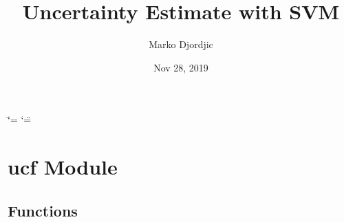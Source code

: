 \documentclass[letterpaper,10pt,english]{sphinxmanual}
\title{Uncertainty Estimate with SVM}
\date{Nov 28, 2019}
\author{Marko Djordjic}
\begin{document}
\ifdefined\shorthandoff
  \ifnum\catcode`\=\string=\active\shorthandoff{=}\fi
  \ifnum\catcode`\"=\active{}\fi
\fi

\pagestyle{empty}
\sphinxmaketitle
\pagestyle{plain}
\sphinxtableofcontents
\pagestyle{normal}
\label{\detokenize{index::doc}}



\chapter{ucf Module}
\label{\detokenize{index:module-ucf}}\label{\detokenize{index:ucf-module}}

\section{Functions}
\label{\detokenize{index:functions}}
\end{document}
